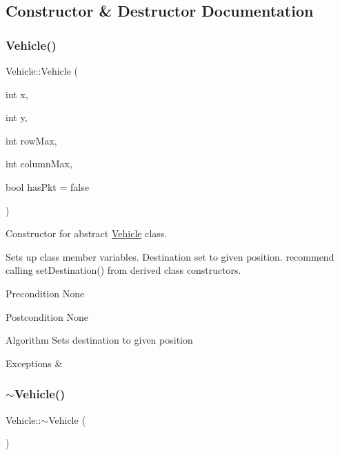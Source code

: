 \subsection{Constructor \& Destructor Documentation}
\hypertarget{class_vehicle_a60120dee00c4b6fec2666828ae0015a5}{}\label{class_vehicle_a60120dee00c4b6fec2666828ae0015a5} 
\subsubsection{\texorpdfstring{Vehicle()}{Vehicle()}}
{\footnotesize\ttfamily Vehicle\+::\+Vehicle (\begin{DoxyParamCaption}\item[{int}]{x,  }\item[{int}]{y,  }\item[{int}]{row\+Max,  }\item[{int}]{column\+Max,  }\item[{bool}]{has\+Pkt = {\ttfamily false} }\end{DoxyParamCaption})}



Constructor for abstract \hyperlink{class_vehicle}{Vehicle} class. 

Sets up class member variables. Destination set to given position. recommend calling set\+Destination() from derived class constructors.

\begin{DoxyPrecond}{Precondition}
None
\end{DoxyPrecond}
\begin{DoxyPostcond}{Postcondition}
None
\end{DoxyPostcond}
\begin{DoxyParagraph}{Algorithm}
Sets destination to given position
\end{DoxyParagraph}

\begin{DoxyExceptions}{Exceptions}
{\em } & \\
\hline
\end{DoxyExceptions}
\hypertarget{class_vehicle_a61ab140c755b8e0e824d54117cf4546f}{}\label{class_vehicle_a61ab140c755b8e0e824d54117cf4546f} 
\subsubsection{\texorpdfstring{$\sim$\+Vehicle()}{~Vehicle()}}
{\footnotesize\ttfamily Vehicle\+::$\sim$\+Vehicle (\begin{DoxyParamCaption}{ }\end{DoxyParamCaption})\hspace{0.3cm}{\ttfamily [inline]}}




